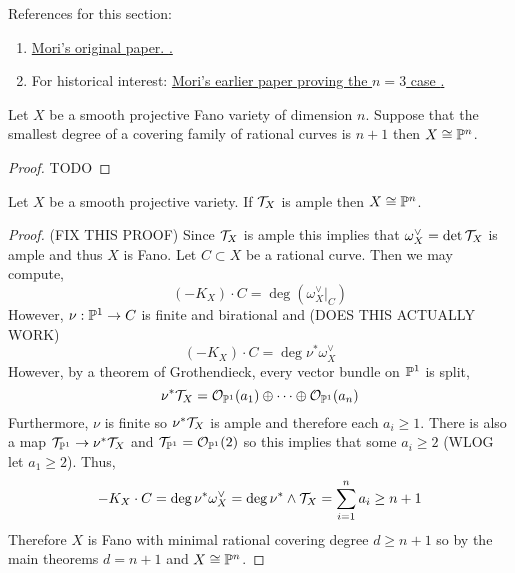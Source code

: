 \documentclass[12pt]{article}
\begin{document}
\begin{rmk}
References for this section:
\begin{enumerate}
\item \href{https://www.jstor.org/stable/1971241?seq=1#metadata_info_tab_contents}{Mori's original paper. \cite{ample_tangent}.}
\item For historical interest: \href{https://projecteuclid.org/journals/kyoto-journal-of-mathematics/volume-18/issue-3/On-Hartshornes-conjecture/10.1215/kjm/1250522508.full}{Mori's earlier paper proving the $n = 3$ case \cite{Hartshorne_conjecture}.}
\end{enumerate}
\end{rmk}

\begin{thm}[Mori]
Let $X$ be a smooth projective Fano variety of dimension $n$. Suppose that the smallest degree of a covering family of rational curves is $n + 1$ then $X \cong \P^n$. 
\end{thm}

\begin{proof}
TODO
\end{proof}

\begin{cor}
Let $X$ be a smooth projective variety. If $\T_X$ is ample then $X \cong \P^n$. 
\end{cor}

\begin{proof}(FIX THIS PROOF)
Since $\T_X$ is ample this implies that $\omega_X^\vee = \det{\T_X}$ is ample and thus $X$ is Fano. Let $C \subset X$ be a rational curve. Then we may compute,
\[ (-K_X) \cdot C = \deg{(\omega_X^\vee|_C)} \]
However, $\nu : \P^1 \to C$ is finite and birational and (DOES THIS ACTUALLY WORK) 
\[ (-K_X) \cdot C = \deg{\nu^* \omega_X^\vee} \]
However, by a theorem of Grothendieck, every vector bundle on $\P^1$ is split,
\[ \nu^* \T_X = \struct{\P^1}(a_1) \oplus \cdots \oplus \struct{\P^1}(a_n) \]
Furthermore, $\nu$ is finite so $\nu^* \T_X$ is ample and therefore each $a_i \ge 1$. There is also a map $\T_{\P^1} \to \nu^* \T_X$ and $\T_{\P^1} = \struct{\P^1}(2)$ so this implies that some $a_i \ge 2$ (WLOG let $a_1 \ge 2$). Thus,
\[ -K_X \cdot C = \deg{\nu^* \omega_X^\vee} = \deg{ \nu^* \wedge \T_X} = \sum_{i = 1}^n a_i \ge n + 1 \]
Therefore $X$ is Fano with minimal rational covering degree $d \ge n + 1$ so by the main theorems $d = n + 1$ and $X \cong \P^n$. 
\end{proof}


\end{document}
